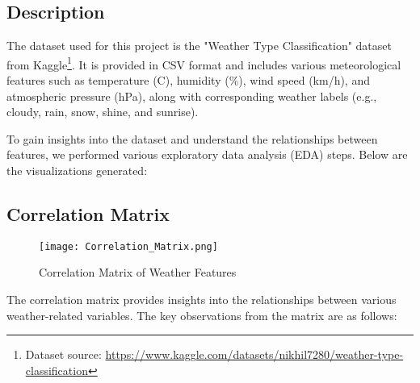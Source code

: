 \documentclass{article}
\begin{document}
\subsection{Description}
The dataset used for this project is the "Weather Type Classification" dataset from Kaggle\footnote{Dataset source: \url{https://www.kaggle.com/datasets/nikhil7280/weather-type-classification}}. It is provided in CSV format and includes various meteorological features such as temperature (\textdegree C), humidity (\%), wind speed (km/h), and atmospheric pressure (hPa), along with corresponding weather labels (e.g., cloudy, rain, snow, shine, and sunrise). 
\begin{table}[ht]
    \centering
    \caption{Descriptive Statistics of Weather Data}
\end{table}



To gain insights into the dataset and understand the relationships between features, we performed various exploratory data analysis (EDA) steps. Below are the visualizations generated:

\subsection{Correlation Matrix}
\begin{figure}[H]
    \centering
    \texttt{[image: Correlation\_Matrix.png]}
    \caption{Correlation Matrix of Weather Features}
\end{figure}
The correlation matrix provides insights into the relationships between various weather-related variables. The key observations from the matrix are as follows:
\end{document}
